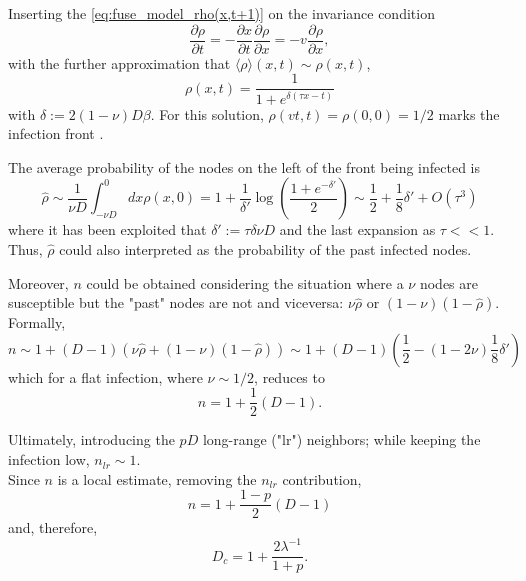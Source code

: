 \documentclass[a4paper,10pt,twoside]{book} %
\theoremstyle{definition}
\begin{document}
Inserting the \autoref{eq:fuse_model_rho(x,t+1)} on the invariance condition 
\begin{equation}
	\frac{\partial \rho}{\partial t} = - \frac{\partial x}{\partial t} \frac{\partial \rho}{\partial x} = -v \frac{\partial \rho}{\partial x},
\end{equation}
with the further approximation that $\langle \rho \rangle(x,t) \sim \rho(x,t)$,
\begin{equation}
	\rho(x,t) = \frac{1}{1+e^{\delta(\tau x - t)}}
\end{equation}
with $\delta:= 2(1-\nu)D \beta$. 
For this solution, $\rho(vt,t) = \rho(0,0) = 1/2$ marks the infection front \cite{Thurner::Appendix_NetBasedExpl}. 

The average probability of the nodes on the left of the front being infected is
\begin{equation}
	\hat{\rho} \sim \frac{1}{\nu D} \int_{-\nu D}^{0} dx \rho(x,0) = 1+ \frac{1}{\delta'} \log( \frac{1+e^{-\delta'}}{2} )
	\sim \frac{1}{2} + \frac{1}{8} \delta' + O(\tau^3) 
	\label{eq:rho_hat_fuse_model}
\end{equation}
where it has been exploited that $\delta':=\tau \delta \nu D$ and the last expansion as $\tau<<1$. Thus, $\hat{\rho}$ could also interpreted as the probability of the past infected nodes.

Moreover, $n$ could be obtained considering the situation where a $\nu$ nodes are susceptible but the "past" nodes are not and viceversa: $\nu \hat{\rho} \text{ or } (1-\nu)(1- \hat{\rho})$. 
\\Formally,
\begin{equation}
	n \sim 1+ (D-1)(\nu\hat{\rho}+(1-\nu)(1-\hat{\rho}))
	\sim 1+ (D-1)(\frac{1}{2} - (1-2\nu) \frac{1}{8} \delta')
\end{equation}
which for a flat infection, where $\nu\sim 1/2$, reduces to
\begin{equation}
	n = 1 + \frac{1}{2}(D-1).
\end{equation} 

Ultimately, introducing the $pD$ long-range ("lr") neighbors; while keeping the infection low, $n_{lr} \sim 1$.
\\Since $n$ is a local estimate, removing the $n_{lr}$ contribution,
\begin{equation}
	n = 1 + \frac{1-p}{2}(D-1)
\end{equation}   
and, therefore,
\begin{equation}
	D_c = 1+ \frac{2 \lambda^{-1}}{1+p}.
	\label{eq:final_D_c_fuse_network}
\end{equation}
\end{document}
